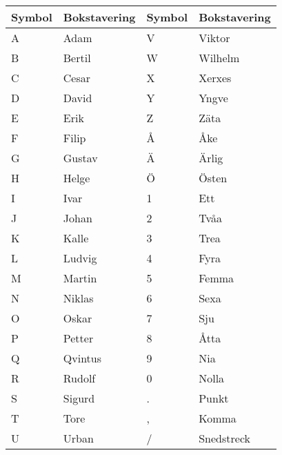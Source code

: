 \begin{longtable}{ll|ll}
	\textbf{Symbol} & \textbf{Bokstavering} & \textbf{Symbol} & \textbf{Bokstavering} \\ \hline
	\endhead
	A               & Adam                  & V               & Viktor                \\
	B               & Bertil                & W               & Wilhelm               \\
	C               & Cesar                 & X               & Xerxes                \\
	D               & David                 & Y               & Yngve                 \\
	E               & Erik                  & Z               & Zäta                  \\
	F               & Filip                 & Å               & Åke                   \\
	G               & Gustav                & Ä               & Ärlig                 \\
	H               & Helge                 & Ö               & Östen                 \\
	I               & Ivar                  & 1               & Ett                   \\
	J               & Johan                 & 2               & Tvåa                  \\
	K               & Kalle                 & 3               & Trea                  \\
	L               & Ludvig                & 4               & Fyra                  \\
	M               & Martin                & 5               & Femma                  \\
	N               & Niklas                & 6               & Sexa                  \\
	O               & Oskar                 & 7               & Sju                   \\
	P               & Petter                & 8               & Åtta                  \\
	Q               & Qvintus               & 9               & Nia                   \\
	R               & Rudolf                & 0               & Nolla                 \\
	S               & Sigurd                & .               & Punkt                 \\
	T               & Tore                  & ,               & Komma                 \\
	U               & Urban                 & /               & Snedstreck
\end{longtable}



